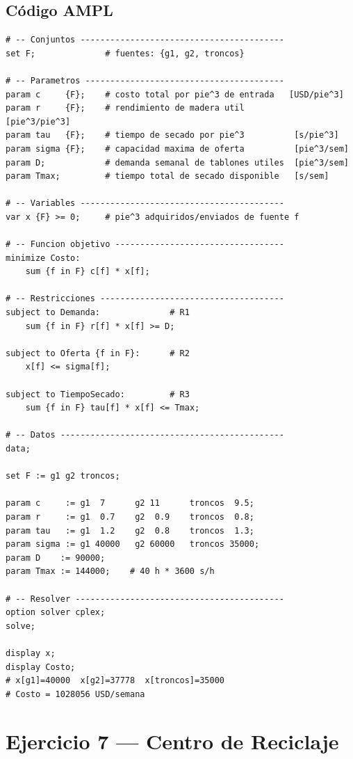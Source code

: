 \documentclass[12pt,a4paper]{article}
\begin{document}
\subsection{Código AMPL}
\begin{lstlisting}[caption={Brady Corporation -- Modelo AMPL}]
# -- Conjuntos -----------------------------------------
set F;              # fuentes: {g1, g2, troncos}

# -- Parametros ----------------------------------------
param c     {F};    # costo total por pie^3 de entrada   [USD/pie^3]
param r     {F};    # rendimiento de madera util          [pie^3/pie^3]
param tau   {F};    # tiempo de secado por pie^3          [s/pie^3]
param sigma {F};    # capacidad maxima de oferta          [pie^3/sem]
param D;            # demanda semanal de tablones utiles  [pie^3/sem]
param Tmax;         # tiempo total de secado disponible   [s/sem]

# -- Variables -----------------------------------------
var x {F} >= 0;     # pie^3 adquiridos/enviados de fuente f

# -- Funcion objetivo ----------------------------------
minimize Costo:
    sum {f in F} c[f] * x[f];

# -- Restricciones -------------------------------------
subject to Demanda:              # R1
    sum {f in F} r[f] * x[f] >= D;

subject to Oferta {f in F}:      # R2
    x[f] <= sigma[f];

subject to TiempoSecado:         # R3
    sum {f in F} tau[f] * x[f] <= Tmax;

# -- Datos ---------------------------------------------
data;

set F := g1 g2 troncos;

param c     := g1  7      g2 11      troncos  9.5;
param r     := g1  0.7    g2  0.9    troncos  0.8;
param tau   := g1  1.2    g2  0.8    troncos  1.3;
param sigma := g1 40000   g2 60000   troncos 35000;
param D    := 90000;
param Tmax := 144000;    # 40 h * 3600 s/h

# -- Resolver ------------------------------------------
option solver cplex;
solve;

display x;
display Costo;
# x[g1]=40000  x[g2]=37778  x[troncos]=35000
# Costo = 1028056 USD/semana
\end{lstlisting}

\clearpage
\section{Ejercicio 7 — Centro de Reciclaje}
\end{document}
